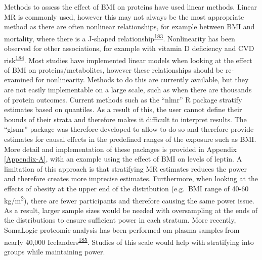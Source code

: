 \documentclass[11pt,twoside]{bristolthesis}
\begin{document}
Methods to assess the effect of BMI on proteins have used linear methods. Linear MR is commonly used, however this may not always be the most appropriate method as there are often nonlinear relationships, for example between BMI and mortality, where there is a J-shaped relationship\textsuperscript{\protect\hyperlink{ref-Sun2019}{183}}. Nonlinearity has been observed for other associations, for example with vitamin D deficiency and CVD risk\textsuperscript{\protect\hyperlink{ref-Zhou2021}{184}}. Most studies have implemented linear models when looking at the effect of BMI on proteins/metabolites, however these relationships should be re-examined for nonlinearity. Methods to do this are currently available, but they are not easily implementable on a large scale, such as when there are thousands of protein outcomes. Current methods such as the ``nlmr'' R package stratify estimates based on quantiles. As a result of this, the user cannot define their bounds of their strata and therefore makes it difficult to interpret results. The ``glsmr'' package was therefore developed to allow to do so and therefore provide estimates for causal effects in the predefined ranges of the exposure such as BMI. More detail and implementation of these packages is provided in Appendix \ref{Appendix-A}, with an example using the effect of BMI on levels of leptin. A limitation of this approach is that stratifying MR estimates reduces the power and therefore creates more imprecise estimates. Furthermore, when looking at the effects of obesity at the upper end of the distribution (e.g.~BMI range of 40-60 kg/m\textsuperscript{2}), there are fewer participants and therefore causing the same power issue. As a result, larger sample sizes would be needed with oversampling at the ends of the distributions to ensure sufficient power in each stratum. More recently, SomaLogic proteomic analysis has been performed om plasma samples from nearly 40,000 Icelanders\textsuperscript{\protect\hyperlink{ref-Ferkingstad2021}{185}}. Studies of this scale would help with stratifying into groups while maintaining power.
\end{document}
